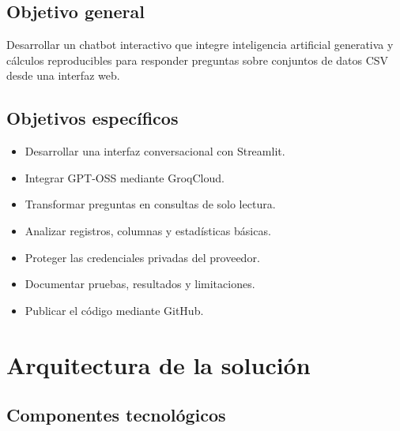 \documentclass[11pt,a4paper]{article}
\begin{document}
\subsection{Objetivo general}

Desarrollar un chatbot interactivo que integre
inteligencia artificial generativa y cálculos
reproducibles para responder preguntas sobre
conjuntos de datos CSV desde una interfaz web.

\subsection{Objetivos específicos}

\begin{itemize}
\item Desarrollar una interfaz conversacional con Streamlit.
\item Integrar GPT-OSS mediante GroqCloud.
\item Transformar preguntas en consultas de solo lectura.
\item Analizar registros, columnas y estadísticas básicas.
\item Proteger las credenciales privadas del proveedor.
\item Documentar pruebas, resultados y limitaciones.
\item Publicar el código mediante GitHub.
\end{itemize}

\section{Arquitectura de la solución}

\subsection{Componentes tecnológicos}
\end{document}
